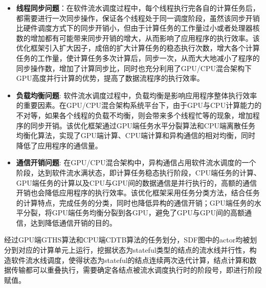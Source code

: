 \begin{itemize}	
  \item {\bf 线程同步问题}：在软件流水调度过程中，每个线程执行完各自的计算任务后，都需要进行一次同步操作，保证各个线程处于同一调度阶段，虽然该同步开销比硬件调度方式下的同步开销小，但由于计算任务的工作量过小或者处理器核数的增加都有可能带来同步开销的增大，从而影响了应用程序的执行效率。该优化框架引入扩大因子，成倍的扩大计算任务的稳态执行次数，增大各个计算任务的工作量，使计算任务多次计算后，同步一次，从而大大地减小了程序的同步操作数，增加了计算同步比，同时也充分利用了GPU/CPU混合架构下GPU高度并行计算的优势，提高了数据流程序的执行效率。

  \item {\bf 负载均衡问题}: 软件流水调度过程中，负载均衡是影响应用程序整体执行效率的重要因素。在GPU/CPU混合架构系统平台下，由于GPU与CPU计算能力的不对等，如果各个线程的负载不均衡，则会带来多个线程忙等的现象，增加程序的同步开销。该优化框架通过GPU端任务水平分裂算法和CPU端离散任务均衡化算法，实现了GPU端计算、CPU端计算和异构通信的相对均衡，同时降低了应用程序的通信量。
  
  \item {\bf 通信开销问题}: 在GPU/CPU混合架构中，异构通信占用软件流水调度的一个阶段，达到软件流水满状态，即计算任务稳态执行阶段，CPU端任务的计算、GPU端任务的计算以及CPU与GPU间的数据通信是并行执行的，高额的通信开销也会降低应用程序的执行效率。该优化框架采用任务分类方法，结合任务的计算特点，完成任务的分类，同时也降低异构的通信开销；GPU端任务的水平分裂，将GPU端任务均衡分裂到各GPU，避免了GPU与GPU间的高额通信，达到降低通信开销的目的。
\end{itemize}

经过GPU端GTHS算法和CPU端CDTB算法的任务划分，SDF图中的actor均被划分到对应的计算单元上运行，挖掘状态为stateful类型的结点的流水线并行性，构造软件流水线调度，使得状态为stateful的结点连续两次迭代计算，结点计算和数据传输都可以重叠执行，需要确定各结点被流水调度执行时的阶段号，即进行阶段赋值。

